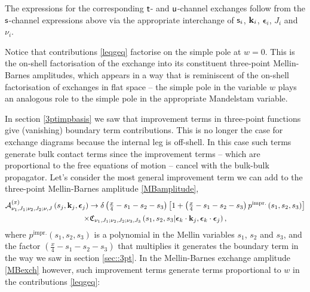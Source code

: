 \documentclass[11pt,a4paper]{article}
\begin{document}
The expressions for the corresponding ${\sf t}$- and ${\sf u}$-channel exchanges follow from the ${\sf s}$-channel expressions above via the appropriate interchange of ${\sf s}_i$, ${\bf k}_i$, $\boldsymbol{\epsilon}_i$, $J_i$ and $\nu_i$. 

Notice that contributions \eqref{leqgeq} factorise on the simple pole at $w=0$. This is the on-shell factorisation of the exchange into its constituent three-point Mellin-Barnes amplitudes, which appears in a way that is reminiscent of the on-shell factorisation of exchanges in flat space -- the simple pole in the variable $w$ plays an analogous role to the simple pole in the appropriate Mandelstam variable. 

In section \ref{3ptimpbasis} we saw that improvement terms in three-point functions give (vanishing) boundary term contributions. This is no longer the case for exchange diagrams because the internal leg is off-shell. In this case such terms generate bulk contact terms since the improvement terms -- which are proportional to the free equations of motion -- cancel with the bulk-bulk propagator. Let's consider the most general improvement term we can add to the three-point Mellin-Barnes amplitude \eqref{MBamplitude}, 
\begin{multline}
    {\cal A}^{(x)}_{\nu_1,J_1;\nu_2,J_2;\nu,J}\left(s_j,{\bf k}_j,\boldsymbol{\epsilon}_j\right) \to \delta\left(\tfrac{x}{4}-s_1-s_2-s_3\right)\left[1+\left(\tfrac{x}{4}-s_1-s_2-s_3\right)p^{\text{impr.}}\left(s_1,s_2,s_3\right)\right]\\ \times  \mathfrak{C}_{\nu_1,J_1;\nu_2,J_2;\nu_3,J_3}\left(s_1,s_2,s_3|\boldsymbol{\epsilon}_k \cdot {\bf k}_j,\boldsymbol{\epsilon}_k \cdot \boldsymbol{\epsilon}_j\right),
\end{multline}
where $p^{\text{impr.}}\left(s_1,s_2,s_3\right)$ is a polynomial in the Mellin variables $s_1$, $s_2$ and $s_3$, and the factor $\left(\tfrac{x}{4}-s_1-s_2-s_3\right)$ that multiplies it generates the boundary term in the way we saw in section \ref{sec::3pt}. In the Mellin-Barnes exchange amplitude \eqref{MBexch} however, such improvement terms generate terms proportional to $w$ in the contributions \eqref{leqgeq}:
\end{document}
